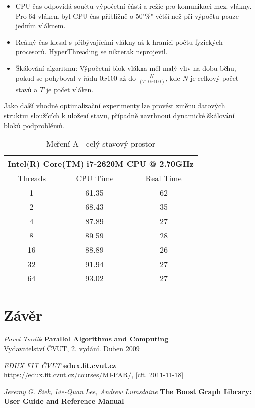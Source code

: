 \documentclass[]{article}
\begin{document}
\begin{itemize}
  \item CPU čas odpovídá součtu výpočetní části a režie pro komunikaci mezi vlákny. Pro 64 vlákem byl CPU čas přibližně o 50"\%" větší než při výpočtu pouze jedním vláknem.
  \item Reálný čas klesal s přibývajícími vlákny až k hranici počtu fyzických procesorů. HyperThreading se nikterak neprojevil.
  \item Škálování algoritmu: Výpočetní blok vlákna měl malý vliv na dobu běhu, pokud se pohyboval v řádu $0x100$ až do $\frac{N}{(T\cdot 0x100)}$, kde $N$ je celkový počet stavů a $T$ je počet vláken.
\end{itemize}

Jako další vhodné optimalizační experimenty lze provést změnu datových struktur sloužících k uložení stavu, případně navrhnout dynamické škálování bloků podproblémů.

\begin{table}
\begin{center}
    \begin{tabular}{ | c | c | c |}
    \hline
    \multicolumn{3}{|c|}{Intel(R) Core(TM) i7-2620M CPU @ 2.70GHz} \\ \hline
    \hline	
Threads	&CPU Time	&Real Time \\ \hline
1	&61.35	&62        \\ \hline
2	&68.43	&35        \\ \hline
4	&87.89	&27        \\ \hline
8	&89.59	&28        \\ \hline
16	&88.89	&26        \\ \hline
32	&91.94	&27        \\ \hline
64	&93.02	&27        \\ \hline
    \end{tabular}
\caption{Meření A - celý stavový prostor}
\end{center}
\end{table}



\section{Závěr}

\newpage
\begin{thebibliography}{9}

{\em Pavel Tvrdík}
       {\bf Parallel Algorithms and Computing}\\
		Vydavatelství ČVUT, 2. vydání. Duben 2009

{\em EDUX FIT ČVUT}
       {\bf edux.fit.cvut.cz}\\
       \url{https://edux.fit.cvut.cz/courses/MI-PAR/}, [cit. 2011-11-18]
       
{\em Jeremy G. Siek, Lie-Quan Lee, Andrew Lumsdaine }
       {\bf The Boost Graph Library: User Guide and Reference Manual}\\
       
       
 \end{thebibliography}
\end{document}
